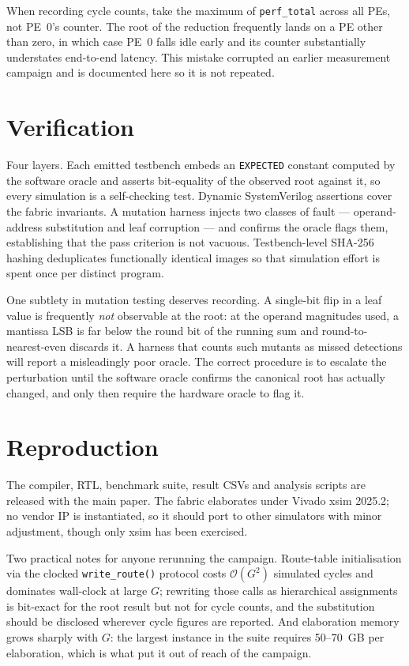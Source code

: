 \documentclass[journal,10pt]{IEEEtran}
\newcommand{\sv}[1]{\texttt{#1}}
\begin{document}
When recording cycle counts, take the maximum of \sv{perf\_total} across all
PEs, not PE~0's counter. The root of the reduction frequently lands on a PE
other than zero, in which case PE~0 falls idle early and its counter
substantially understates end-to-end latency. This mistake corrupted an
earlier measurement campaign and is documented here so it is not repeated.

\section{Verification}

Four layers. Each emitted testbench embeds an \sv{EXPECTED} constant computed
by the software oracle and asserts bit-equality of the observed root against
it, so every simulation is a self-checking test. Dynamic SystemVerilog
assertions cover the fabric invariants. A mutation harness injects two
classes of fault --- operand-address substitution and leaf corruption --- and
confirms the oracle flags them, establishing that the pass criterion is not
vacuous. Testbench-level SHA-256 hashing deduplicates functionally identical
images so that simulation effort is spent once per distinct program.

One subtlety in mutation testing deserves recording. A single-bit flip in a
leaf value is frequently \emph{not} observable at the root: at the operand
magnitudes used, a mantissa LSB is far below the round bit of the running sum
and round-to-nearest-even discards it. A harness that counts such mutants as
missed detections will report a misleadingly poor oracle. The correct
procedure is to escalate the perturbation until the software oracle confirms
the canonical root has actually changed, and only then require the hardware
oracle to flag it.

\section{Reproduction}

The compiler, RTL, benchmark suite, result CSVs and analysis scripts are
released with the main paper. The fabric elaborates under Vivado xsim 2025.2;
no vendor IP is instantiated, so it should port to other simulators with
minor adjustment, though only xsim has been exercised.

Two practical notes for anyone rerunning the campaign. Route-table
initialisation via the clocked \sv{write\_route()} protocol costs
$\mathcal{O}(G^2)$ simulated cycles and dominates wall-clock at large $G$;
rewriting those calls as hierarchical assignments is bit-exact for the root
result but not for cycle counts, and the substitution should be disclosed
wherever cycle figures are reported. And elaboration memory grows sharply
with $G$: the largest instance in the suite requires 50--70~GB per
elaboration, which is what put it out of reach of the campaign.
\end{document}
